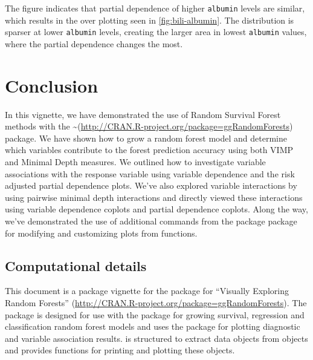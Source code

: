 \documentclass[article, nojss]{jss}
\begin{document}
The figure indicates that partial dependence of higher \texttt{albumin}
levels are similar, which results in the over plotting seen in
\autoref{fig:bili-albumin}. The distribution is sparser at lower
\texttt{albumin} levels, creating the larger area in lowest
\texttt{albumin} values, where the partial dependence changes the most.

\section{Conclusion}\label{conclusion}

In this vignette, we have demonstrated the use of Random Survival Forest
methods with the
\textasciitilde{}(\url{http://CRAN.R-project.org/package=ggRandomForests})
package. We have shown how to grow a random forest model and determine
which variables contribute to the forest prediction accuracy using both
VIMP and Minimal Depth measures. We outlined how to investigate variable
associations with the response variable using variable dependence and
the risk adjusted partial dependence plots. We've also explored variable
interactions by using pairwise minimal depth interactions and directly
viewed these interactions using variable dependence coplots and partial
dependence coplots. Along the way, we've demonstrated the use of
additional commands from the  package
\citep[\url{http://CRAN.R-project.org/package=ggplot2}]{Wickham:2009}
package for modifying and customizing plots from 
functions.

\subsection{Computational details}\label{computational-details}

This document is a package vignette for the 
package for ``Visually Exploring Random Forests''
(\url{http://CRAN.R-project.org/package=ggRandomForests}). The
 package is designed for use with the
 package
\citep[\url{http://CRAN.R-project.org/package=randomForestSRC}]{Ishwaran:RFSRC:2014}
for growing survival, regression and classification random forest models
and uses the  package
\citep[\url{http://CRAN.R-project.org/package=ggplot2}]{Wickham:2009}
for plotting diagnostic and variable association results.
 is structured to extract data objects from
 objects and provides functions for printing and
plotting these objects.
\end{document}
